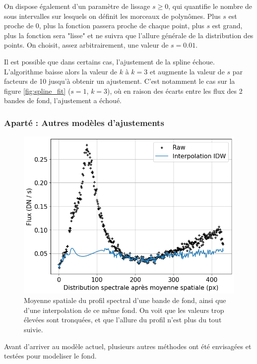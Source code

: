 \documentclass[11pt, a4paper]{article}
\begin{document}
On dispose également d'un paramètre de lissage $s \geq 0$, qui quantifie le nombre de sous intervalles sur lesquels on définit les morceaux de polynômes. Plus $s$ est proche de 0, plus la fonction passera proche de chaque point, plus $s$ est grand, plus la fonction sera "lisse" et ne suivra que l'allure générale de la distribution des points. On choisit, assez arbitrairement, une valeur de $s=0.01$.

Il est possible que dans certains cas, l'ajustement de la spline échoue. L'algorithme baisse alors la valeur de $k$ à $k=3$ et augmente la valeur de $s$ par facteurs de 10 jusqu'à obtenir un ajustement. C'est notamment le cas sur la figure \ref{fig:spline_fit} ($s=1$, $k=3$), où en raison des écarts entre les flux des 2 bandes de fond, l'ajustement a échoué.


\subsubsection{Aparté : Autres modèles d'ajustements}

\begin{figure}
  \centering
  \includegraphics[scale=0.3]{assets/idw_interpolation.png}
  \caption{Moyenne spatiale du profil spectral d'une bande de fond, ainsi que d'une interpolation de ce même fond. On voit que les valeurs trop élevées sont tronquées, et que l'allure du profil n'est plus du tout suivie.}
  \label{fig:interpolation}
\end{figure}

Avant d'arriver au modèle actuel, plusieurs autres méthodes ont été envisagées et testées pour modeliser le fond.\\
\end{document}
